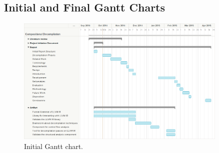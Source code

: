 
\subsection{Initial and Final Gantt Charts}

\begin{figure}[htbp]
	\begin{center}
		\includegraphics[angle=270, width=0.9\textwidth]{inc/appendices/gantt_charts/gantt_initial.png}
		\caption{Initial Gantt chart.}
	\end{center}
\end{figure}

